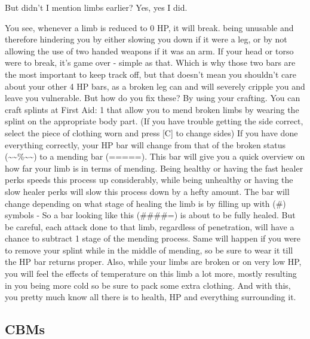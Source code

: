 \documentclass[11pt]{report}
\begin{document}
But didn't I mention limbs earlier? Yes, yes I did.

You see, whenever a limb is reduced to 0 HP, it will break. being unusable and therefore hindering you by either slowing you down if it were a leg, or by not allowing the use of two handed weapons if it was an arm. If your head or torso were to break, it's game over - simple as that. Which is why those two bars are the most important to keep track off, but that doesn't mean you shouldn't care about your other 4 HP bars, as a broken leg can and will severely cripple you and leave you vulnerable.
But how do you fix these? By using your crafting. You can craft splints at First Aid: 1 that allow you to mend broken limbs by wearing the splint on the appropriate body part. (If you have trouble getting the side correct, select the piece of clothing worn and press [C] to change sides) If you have done everything correctly, your HP bar will change from that of the broken status (\~{}\~{}\%\~{}\~{}) to a mending bar (=====). This bar will give you a quick overview on how far your limb is in terms of mending. Being healthy or having the fast healer perks speeds this process up considerably, while being unhealthy or having the slow healer perks will slow this process down by a hefty amount. The bar will change depending on what stage of healing the limb is by filling up with (\#) symbols - So a bar looking like this (\#\#\#\#=) is about to be fully healed. But be careful, each attack done to that limb, regardless of penetration, will have a chance to subtract 1 stage of the mending process. Same will happen if you were to remove your splint while in the middle of mending, so be sure to wear it till the HP bar returns proper. Also, while your limbs are broken or on very low HP, you will feel the effects of temperature on this limb a lot more, mostly resulting in you being more cold so be sure to pack some extra clothing. And with this, you pretty much know all there is to health, HP and everything surrounding it.

\subsection{CBMs}
\end{document}
